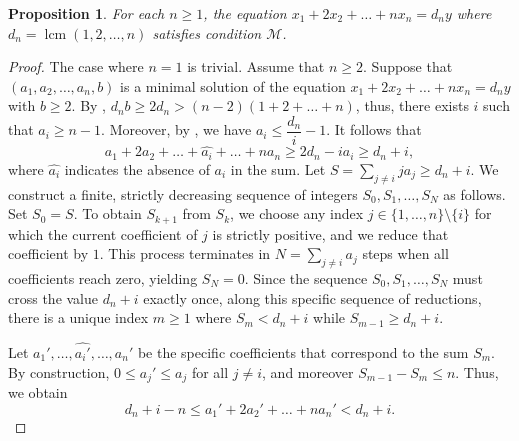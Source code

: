\documentclass[12pt]{amsart}
\numberwithin{equation}{section}
\newtheorem{proposition}[theorem]{Proposition}
\theoremstyle{definition}
\DeclareMathOperator{\lcm}{lcm}
\begin{document}
\begin{proposition}
    \label{prop.minSol}
    For each $n\ge 1$, the equation $x_1+2x_2+\ldots +nx_n=d_ny$ where $d_n=\lcm(1,2,\ldots , n)$ satisfies condition $\mathcal{M}$.
\end{proposition}
\begin{proof}
    The case where $n=1$ is trivial. Assume that $n\ge 2$. Suppose that $(a_1,a_2,\ldots ,a_n,b)$ is a minimal solution of the equation $x_1+2x_2+\ldots +nx_n=d_ny$ with $b\ge 2$. By , $d_nb \ge 2d_n > (n-2)(1+2+\ldots +n)$, thus, there exists $i$ such that $a_i\ge n-1$. Moreover, by , we have $a_i \le \dfrac{d_n}{i}-1$. It follows that 
    \[
    a_1+2a_2 +\ldots + \widehat{a_i} + \ldots +na_n \ge 2d_n - ia_i \ge d_n +i,
    \]
    where $\widehat{a_i}$ indicates the absence of $a_i$ in the sum. Let $S = \sum_{j \ne i} j a_j \ge d_n + i$. We construct a finite, strictly decreasing sequence of integers $S_0, S_1, \ldots, S_N$ as follows. Set $S_0 = S$. To obtain $S_{k+1}$ from $S_k$, we choose any index $j \in \{1, \ldots, n\} \setminus \{i\}$ for which the current coefficient of $j$ is strictly positive, and we reduce that coefficient by $1$. This process terminates in $N = \sum_{j \ne i} a_j$ steps when all coefficients reach zero, yielding $S_N = 0$. Since the sequence $S_0, S_1, \ldots, S_N$ must cross the value $d_n + i$ exactly once, along this specific sequence of reductions, there is a unique index $m \ge 1$ where $S_m < d_n + i$ while $S_{m-1} \ge d_n + i$.

    Let $a_1', \dots, \widehat{a_i'}, \dots, a_n'$ be the specific coefficients that correspond to the sum $S_m$. By construction, $0 \le a_j' \le a_j$ for all $j \ne i$, and moreover $S_{m-1} - S_m \le n$. Thus, we obtain
    \[
    d_n+i-n \le a_1'+2a_2'+\ldots + na_n' < d_n + i.
    \]


\end{proof}
\end{document}
